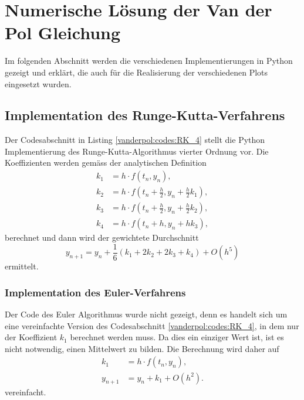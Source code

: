 %
%
%
\section{Numerische Lösung der Van der Pol Gleichung
\label{vanderpol:section:loesung}}
Im folgenden Abschnitt werden die verschiedenen Implementierungen in Python gezeigt und erklärt, die auch für die Realisierung der verschiedenen Plots eingesetzt wurden.
%

\subsection{Implementation des Runge-Kutta-Verfahrens
\label{vanderpol:subsection:rk}}
Der Codesabschnitt in Listing \ref{vanderpol:codes:RK_4} stellt die Python Implementierung des Runge-Kutta-Algorithmus vierter Ordnung vor. Die Koeffizienten werden gemäss der analytischen Definition
%
\begin{align*}
k_1 &= h \cdot f(t_n, y_n),\\
k_2 &= h \cdot f\left(t_n + \frac{h}{2}, y_n + \frac{h}{2} k_1\right), \\
k_3 &= h \cdot f\left(t_n + \frac{h}{2}, y_n + \frac{h}{2} k_2\right), \\
k_4 &= h \cdot f(t_n + h, y_n + h k_3),
\end{align*}
berechnet und dann wird der gewichtete Durchschnitt
\begin{equation}
y_{n+1} = y_n + \frac{1}{6}(k_1 + 2k_2 + 2k_3 + k_4) +O(h^5)
\end{equation}
ermittelt.
\subsubsection{Implementation des Euler-Verfahrens
\label{vanderpol:subsubsection:euler}}
Der Code des Euler Algorithmus wurde nicht gezeigt, denn es handelt sich um eine vereinfachte Version des Codesabschnitt \ref{vanderpol:codes:RK_4}, in dem nur der Koeffizient $k_1$ berechnet werden muss. Da dies ein einziger Wert ist, ist es nicht notwendig, einen Mittelwert zu bilden. Die Berechnung wird daher auf
\begin{align*}
k_1 &= h \cdot f(t_n, y_n), \\
y_{n+1} &= y_n + k_1 +O(h^2).
\end{align*}
vereinfacht.

